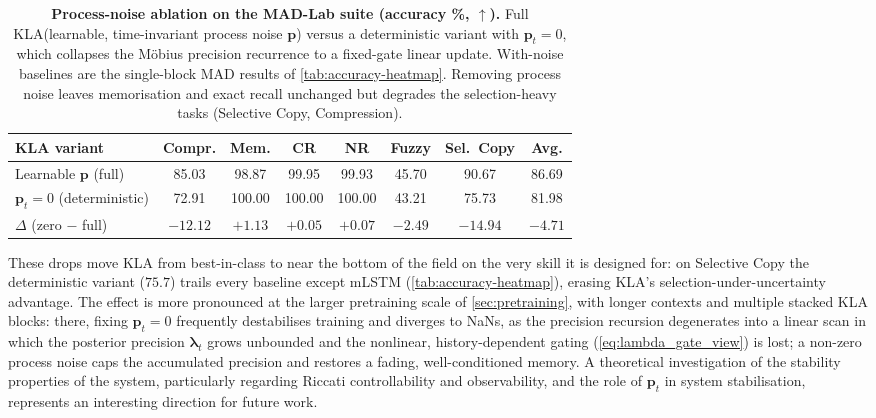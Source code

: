 \documentclass{article}
\newcommand{\our}{\textsc{KLA}\xspace}
\begin{document}
\begin{table}[h]
\caption{\textbf{Process-noise ablation on the MAD-Lab suite (accuracy \%, $\uparrow$).}
Full \our (learnable, time-invariant process noise $\mathbf{p}$) versus a deterministic
variant with $\mathbf{p}_t{=}0$, which collapses the M\"{o}bius precision recurrence to a
fixed-gate linear update. With-noise baselines are the single-block
MAD results of \cref{tab:accuracy-heatmap}. Removing process noise leaves memorisation and
exact recall unchanged but degrades the selection-heavy tasks (Selective Copy, Compression).}
\label{tab:process-noise-ablation}
\centering
\small
\setlength{\tabcolsep}{4pt}
\renewcommand{\arraystretch}{1.15}
\begin{tabular}{lccccccc}
\toprule
\textbf{\our{} variant} & \textbf{Compr.} & \textbf{Mem.} & \textbf{CR} & \textbf{NR} & \textbf{Fuzzy} & \textbf{Sel.\ Copy} & \textbf{Avg.} \\
\midrule
Learnable $\mathbf{p}$ (full)      & 85.03 & 98.87 & 99.95 & 99.93 & 45.70 & 90.67 & 86.69 \\
$\mathbf{p}_t{=}0$ (deterministic) & 72.91 & 100.00 & 100.00 & 100.00 & 43.21 & 75.73 & 81.98 \\
\midrule
$\Delta$ (zero $-$ full)           & $-12.12$ & $+1.13$ & $+0.05$ & $+0.07$ & $-2.49$ & $-14.94$ & $-4.71$ \\
\bottomrule
\end{tabular}
\end{table}

These drops move \our from best-in-class to near the bottom of the field on the very skill it is designed for: on Selective Copy the deterministic variant ($75.7$) trails every baseline except mLSTM (\cref{tab:accuracy-heatmap}), erasing \our's selection-under-uncertainty advantage. The effect is more pronounced at the larger pretraining scale of \cref{sec:pretraining}, with longer contexts and multiple stacked \our blocks: there, fixing $\mathbf{p}_t{=}0$ frequently destabilises training and diverges to NaNs, as the precision recursion degenerates into a linear scan in which the posterior precision $\boldsymbol{\lambda}_t$ grows unbounded and the nonlinear, history-dependent gating (\cref{eq:lambda_gate_view}) is lost; a non-zero process noise caps the accumulated precision and restores a fading, well-conditioned memory. A theoretical investigation of the stability properties of the system, particularly regarding Riccati controllability and observability, and the role of $\mathbf{p}_t$ in system stabilisation, represents an interesting direction for future work.
\end{document}
